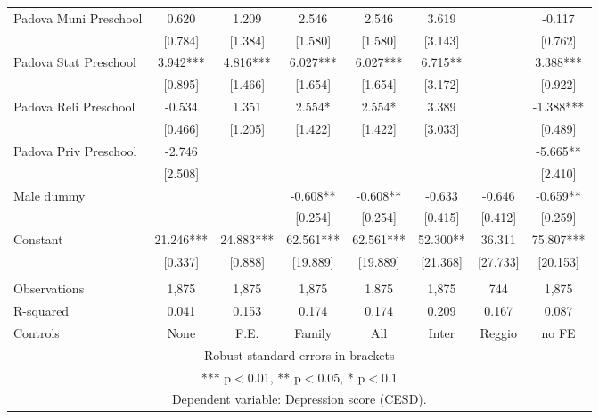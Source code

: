\begin{tabular}{lccccccc}
Padova Muni Preschool & 0.620 & 1.209 & 2.546 & 2.546 & 3.619 &  & -0.117 \\
 & [0.784] & [1.384] & [1.580] & [1.580] & [3.143] &  & [0.762] \\
Padova Stat Preschool & 3.942*** & 4.816*** & 6.027*** & 6.027*** & 6.715** &  & 3.388*** \\
 & [0.895] & [1.466] & [1.654] & [1.654] & [3.172] &  & [0.922] \\
Padova Reli Preschool & -0.534 & 1.351 & 2.554* & 2.554* & 3.389 &  & -1.388*** \\
 & [0.466] & [1.205] & [1.422] & [1.422] & [3.033] &  & [0.489] \\
Padova Priv Preschool & -2.746 &  &  &  &  &  & -5.665** \\
 & [2.508] &  &  &  &  &  & [2.410] \\
Male dummy &  &  & -0.608** & -0.608** & -0.633 & -0.646 & -0.659** \\
 &  &  & [0.254] & [0.254] & [0.415] & [0.412] & [0.259] \\
Constant & 21.246*** & 24.883*** & 62.561*** & 62.561*** & 52.300** & 36.311 & 75.807*** \\
 & [0.337] & [0.888] & [19.889] & [19.889] & [21.368] & [27.733] & [20.153] \\
 &  &  &  &  &  &  &  \\
Observations & 1,875 & 1,875 & 1,875 & 1,875 & 1,875 & 744 & 1,875 \\
R-squared & 0.041 & 0.153 & 0.174 & 0.174 & 0.209 & 0.167 & 0.087 \\
 Controls & None & F.E. & Family & All & Inter & Reggio & no FE \\ \hline
\multicolumn{8}{c}{ Robust standard errors in brackets} \\
\multicolumn{8}{c}{ *** p$<$0.01, ** p$<$0.05, * p$<$0.1} \\
\multicolumn{8}{c}{ Dependent variable: Depression score (CESD).} \\
\end{tabular}

